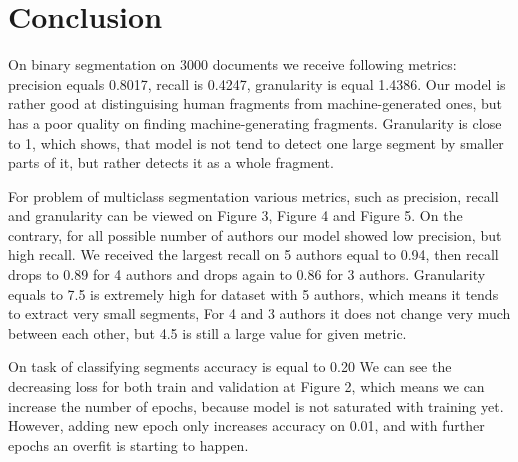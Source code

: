 \documentclass{article}
\begin{document}




  
\section{Conclusion}

On binary segmentation on 3000 documents we receive following metrics: precision equals 0.8017, recall is 0.4247, granularity is equal 1.4386. Our model is rather good at distinguising human fragments from machine-generated ones, but has a poor quality on finding machine-generating fragments. Granularity is close to 1, which shows, that model is not tend to detect one large segment by smaller parts of it, but rather detects it as a whole fragment. 

For problem of multiclass segmentation various metrics, such as precision, recall and granularity can be viewed on Figure 3, Figure 4 and Figure 5.  On the contrary, for all possible number of authors our model showed low precision, but high recall. We received the largest recall on 5 authors equal to 0.94, then recall drops to 0.89 for 4 authors and drops again to 0.86 for 3 authors. Granularity equals to 7.5 is extremely high for dataset with 5 authors, which means it tends to extract very small segments, For 4 and 3 authors it does not change very much between each other, but 4.5 is still a large value for given metric.

On task of classifying segments accuracy is equal to 0.20 We can see the decreasing loss for both train and validation at Figure 2, which means we can increase the number of epochs, because model is not saturated with training yet. However, adding new epoch only increases accuracy on 0.01, and with further epochs an overfit is starting to happen. 
\end{document}

